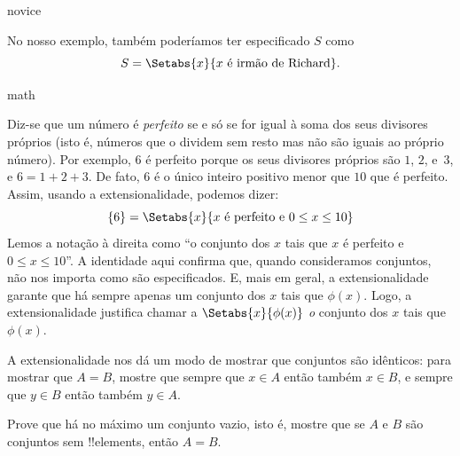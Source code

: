 \documentclass[../../../include/open-logic-section]{subfiles}
\begin{document}
\begin{tagblock}{novice}
\begin{ex}
No nosso exemplo, também poderíamos ter especificado $S$ como
\[
S = \Setabs{x}{x \text{ é irmão de Richard}}.
\]
\end{ex}
\end{tagblock}

\begin{tagblock}{math}
\begin{ex}
Diz-se que um número é \emph{perfeito} se e só se for igual à soma dos seus
divisores próprios (isto é, números que o dividem sem resto mas não são
iguais ao próprio número). Por exemplo, $6$ é perfeito porque os seus
divisores próprios são $1$, $2$, e~$3$, e $6 = 1 + 2 + 3$. De fato,
$6$ é o único inteiro positivo menor que $10$ que é perfeito. Assim,
usando a extensionalidade, podemos dizer:
\[
	\{6\} = \Setabs{x}{x\text{ é perfeito e }0 \leq x \leq 10}
\]
Lemos a notação à direita como ``o conjunto dos $x$ tais que $x$
é perfeito e $0 \leq x \leq 10$''. A identidade aqui confirma que,
quando consideramos conjuntos, não nos importa como são especificados.
E, mais em geral, a extensionalidade garante que há sempre
apenas um conjunto dos $x$ tais que $\phi(x)$.
Logo, a extensionalidade justifica chamar a
$\Setabs{x}{\phi(x)}$ \emph{o} conjunto dos $x$ tais que~$\phi(x)$.
\end{ex}
\end{tagblock}

A extensionalidade nos dá um modo de mostrar que conjuntos são idênticos: para
mostrar que $A = B$, mostre que sempre que $x \in A$ então também $x \in B$,
e sempre que $y \in B$ então também $y \in A$.

\begin{prob}
Prove que há no máximo um conjunto vazio, isto é, mostre que se $A$ e $B$
são conjuntos sem !!{element}s, então $A = B$.
\end{prob}
\end{document}
